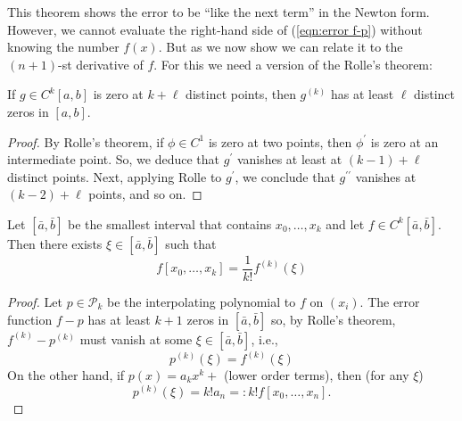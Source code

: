 \documentclass[a4paper]{article}
\begin{document}
This theorem shows the error to be ``like the next term'' in the Newton form. However, we cannot evaluate the right-hand side of (\ref{eqn:error f-p}) without knowing the number $f(x)$. But as we now show we can relate it to the $(n+1)$-st derivative of $f$. For this we need a version of the Rolle's theorem:

\begin{lemma}
    If $g \in C^{k}[a, b]$ is zero at $k+\ell$ distinct points, then $g^{(k)}$ has at least $\ell$ distinct zeros in $[a, b]$.
\end{lemma}
\begin{proof}
    By Rolle's theorem, if $\phi \in C^{1}$ is zero at two points, then $\phi^{\prime}$ is zero at an intermediate point. So, we deduce that $g^{\prime}$ vanishes at least at $(k-1)+\ell$ distinct points. Next, applying Rolle to $g^{\prime}$, we conclude that $g^{\prime \prime}$ vanishes at $(k-2)+\ell$ points, and so on.
\end{proof}
\begin{theorem}
    Let $[\bar{a}, \bar{b}]$ be the smallest interval that contains $x_{0}, \ldots, x_{k}$ and let $f \in C^{k}[\bar{a}, \bar{b}]$. Then there exists $\xi \in[\bar{a}, \bar{b}]$ such that
    \begin{equation}\label{eqn:divided difference taylor}
        f[x_{0}, \ldots, x_{k}]=\frac{1}{k !} f^{(k)}(\xi)
    \end{equation}
\end{theorem}
\begin{proof}
    Let $p \in \mathcal{P}_{k}$ be the interpolating polynomial to $f$ on $\left(x_{i}\right)$. The error function $f-p$ has at least $k+1$ zeros in $[\bar{a}, \bar{b}]$ so, by Rolle's theorem, $f^{(k)}-p^{(k)}$ must vanish at some $\xi \in[\bar{a}, \bar{b}]$, i.e.,
    $$
    p^{(k)}(\xi)=f^{(k)}(\xi)
    $$
    On the other hand, if $p(x)=a_{k} x^{k}+$ (lower order terms), then (for any $\xi$)
    $$
    p^{(k)}(\xi)=k ! a_{n}=: k ! f[x_{0}, \ldots, x_{n}] .
    $$
\end{proof}
\end{document}
